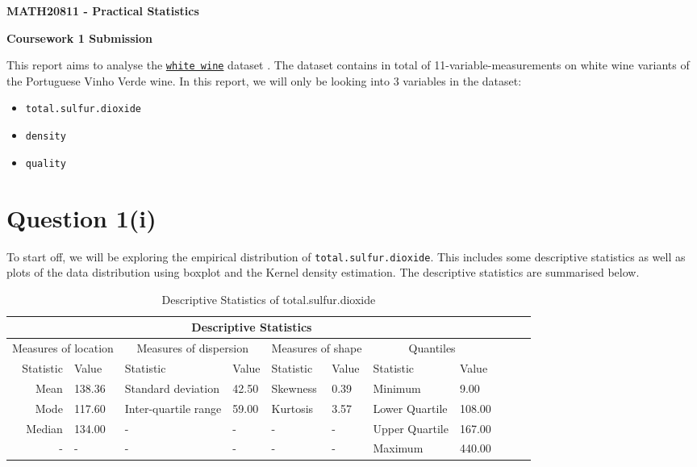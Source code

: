 \documentclass[11pt,a4]{article}
\begin{document}
	
\begin{center}
	\bf{\Large{MATH20811 - Practical Statistics}} 
	\bigskip
	\bigskip
	
		\bf{\Large{Coursework 1 Submission}} 
\end{center}	

\bigskip
\bigskip

This report aims to analyse the \href{https://online.manchester.ac.uk/bbcswebdav/pid-12106887-dt-content-rid-61306182_1/courses/I3133-MATH-20811-1201-1SE-020801/white_wine.csv}{\tt white wine} dataset \cite{CCKT}. The dataset contains in total of 11-variable-measurements on white wine variants of the Portuguese Vinho Verde wine. In this report, we will only be looking into 3 variables in the dataset: 

\begin{itemize}
    \item \verb|total.sulfur.dioxide|
    \item \verb|density|
    \item \verb|quality|
\end{itemize}

\section{Question 1(i)}
To start off, we will be exploring the empirical distribution of \verb|total.sulfur.dioxide|. This includes some descriptive statistics as well as plots of the data distribution using boxplot and the Kernel density estimation. The descriptive statistics are summarised below.

\begin{table}[ht]
\centering
\begin{tabular}{rllllllllll}
  \hline
  \multicolumn{8}{c}{Descriptive Statistics}  \\
  \hline
   \multicolumn{2}{c}{Measures of location} &   \multicolumn{2}{c}{Measures of dispersion} &  \multicolumn{2}{c}{Measures of shape} &   \multicolumn{2}{c}{Quantiles}\\
   \hline
   Statistic & Value &  Statistic & Value &  Statistic & Value &  Statistic & Value\\
  \hline
   Mean & 138.36 &  Standard deviation & 42.50 &  Skewness & 0.39 &  Minimum & 9.00\\
  \hline
Mode & 117.60 &  Inter-quartile range & 59.00 &  Kurtosis & 3.57 &  Lower Quartile & 108.00\\ 
\hline
Median & 134.00 & -  & - & - & - &  Upper Quartile & 167.00\\ 
\hline
 - & - & - & - & - & - &  Maximum & 440.00\\ 
   \hline
\end{tabular}
\caption{Descriptive Statistics of total.sulfur.dioxide}
\label{tab1}
\end{table}
\end{document}
